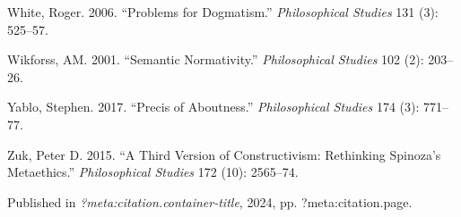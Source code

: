 \documentclass[
  10pt,
  letterpaper,
  DIV=11,
  numbers=noendperiod,
  twoside]{scrartcl}
\newlength{\cslhangindent}
\newenvironment{CSLReferences}[2] %
 {\begin{list}{}{%
  \setlength{\itemindent}{0pt}
  \setlength{\leftmargin}{0pt}
  \setlength{\parsep}{0pt}
  \ifodd #1
   \setlength{\leftmargin}{\cslhangindent}
   \setlength{\itemindent}{-1\cslhangindent}
  \fi
  \setlength{\itemsep}{#2\baselineskip}}}
 {\end{list}}
\begin{document}
\begin{CSLReferences}{1}{0}
White, Roger. 2006. {``Problems for Dogmatism.''} \emph{Philosophical
Studies} 131 (3): 525--57.

Wikforss, AM. 2001. {``Semantic Normativity.''} \emph{Philosophical
Studies} 102 (2): 203--26.

Yablo, Stephen. 2017. {``Precis of Aboutness.''} \emph{Philosophical
Studies} 174 (3): 771--77.

Zuk, Peter D. 2015. {``A Third Version of Constructivism: Rethinking
Spinoza's Metaethics.''} \emph{Philosophical Studies} 172 (10):
2565--74.

\end{CSLReferences}



\noindent Published in\emph{
?meta:citation.container-title}, 2024, pp. ?meta:citation.page.
\end{document}
